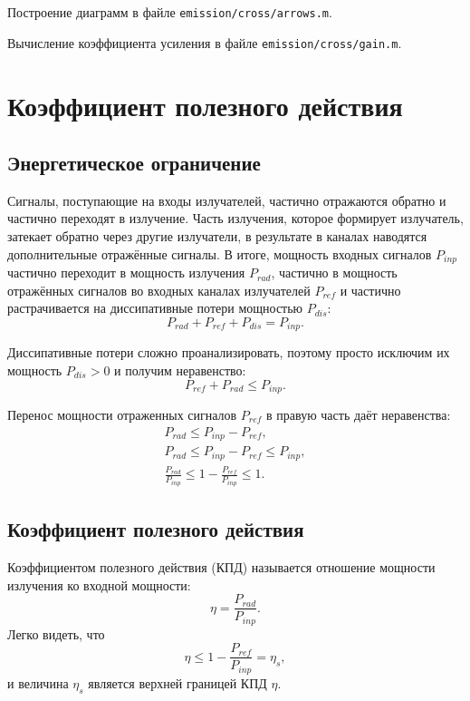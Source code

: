 Построение диаграмм в файле \texttt{emission/cross/arrows.m}.

Вычисление коэффициента усиления в файле \texttt{emission/cross/gain.m}.

\section{Коэффициент полезного действия}

\subsection{Энергетическое ограничение}

Сигналы, поступающие на входы излучателей, частично отражаются обратно и частично переходят в излучение. Часть излучения, которое формирует излучатель,
затекает обратно через другие излучатели, в результате в каналах наводятся дополнительные отражённые сигналы. В итоге, мощность входных сигналов
$P_{inp}$ частично переходит в мощность излучения $P_{rad}$, частично в мощность отражённых сигналов во входных каналах излучателей $P_{ref}$ и
частично растрачивается на диссипативные потери мощностью $P_{dis}$:
\[
    P_{rad} + P_{ref} + P_{dis} = P_{inp}.
\]

Диссипативные потери сложно проанализировать, поэтому просто исключим их мощность $P_{dis} >0$ и получим неравенство:
\begin{equation}
    \label{emission:efficiency:power_inequality}
    P_{ref} + P_{rad} \le P_{inp} .
\end{equation}

Перенос мощности отраженных сигналов $P_{ref}$ в правую часть даёт неравенства:
\begin{gather*}
    P_{rad} \le P_{inp} - P_{ref}, \\
    P_{rad} \le P_{inp} - P_{ref} \le P_{inp}, \\
    \frac{P_{rad}}{P_{inp}} \le 1 - \frac{P_{ref}}{P_{inp}} \le 1 .
\end{gather*}

\subsection{Коэффициент полезного действия}

Коэффициентом полезного действия (КПД) называется отношение мощности излучения ко входной мощности:
\[
    \eta = \frac{P_{rad}}{P_{inp}}.
\]
Легко видеть, что
\[
    \eta \le 1 - \frac{P_{ref}}{P_{inp}} = \eta_s ,
\]
и величина $\eta_s$ является верхней границей КПД $\eta$.

